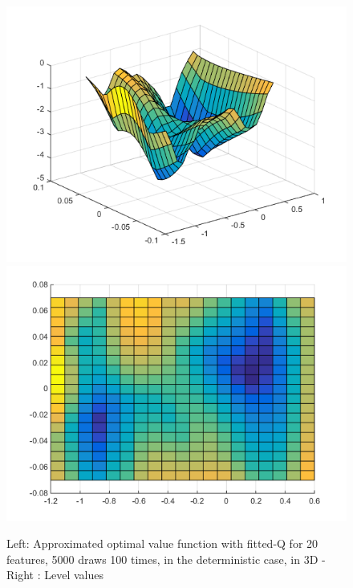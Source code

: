 \documentclass[a4paper, 12pt]{article}
\begin{document}
\begin{figure}[H]
	\centering
	\noindent\includegraphics[scale=0.4]{fittedQ-5ep-5000draws-deterministic.png}
	\noindent\includegraphics[scale=0.4]{fittedQ-5ep-5000draws-deterministic-levels.png}
	\caption{Left: Approximated optimal value function with fitted-Q for 20 features, 5000 draws 100 times, in the deterministic case, in 3D - Right : Level values}
\end{figure}
\end{document}

